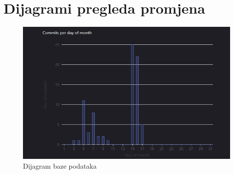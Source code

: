 	
					
					
		\eject
		\section*{Dijagrami pregleda promjena}
		\begin{figure}[H]
			\includegraphics[scale=0.7]{slike/Aktivnost.png}
			\centering
			\caption{Dijagram baze podataka}
			\label{fig:promjene}
		          \end{figure}
		
		
	